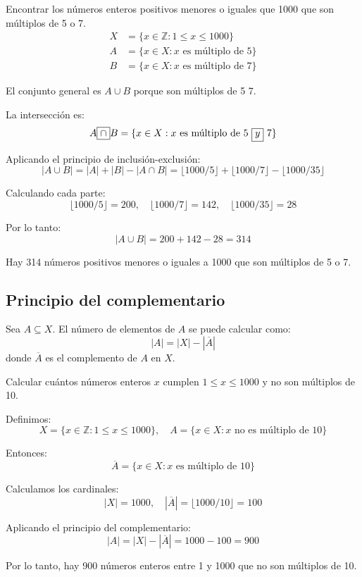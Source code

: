 \documentclass[a4paper,12pt]{article}
\begin{document}
\begin{ejemplo}[title=Ejemplo: Números múltiplos de 5 o 7]
Encontrar los números enteros positivos menores o iguales que 1000 que son múltiplos de 5 o 7.
\begin{align*}
X &= \{ x \in \mathbb{Z} : 1 \le x \le 1000 \} \\
A &= \{ x \in X : x \text{ es múltiplo de 5} \} \\
B &= \{ x \in X : x \text{ es múltiplo de 7} \}
\end{align*}

El conjunto general es $A \boxed{\cup} B$ porque son múltiplos de 5  7.

La intersección es:
\[
A \boxed{\cap} B = \{ x \in X : x \text{ es múltiplo de 5 \boxed{y}
7} \}
\]

Aplicando el principio de inclusión-exclusión:
\[
|A \cup B| = |A| + |B| - |A \cap B| = \lfloor 1000/5 \rfloor + \lfloor 1000/7 \rfloor \boxed{-} \lfloor 1000/35 \rfloor
\]

Calculando cada parte:
\[
\lfloor 1000/5 \rfloor = 200, \quad
\lfloor 1000/7 \rfloor = 142, \quad
\lfloor 1000/35 \rfloor = 28
\]

Por lo tanto:
\[
|A \cup B| = 200 + 142 - 28 = 314
\]

Hay 314 números positivos menores o iguales a 1000 que son múltiplos de 5 o 7.
\end{ejemplo}

\subsection{Principio del complementario}

\begin{procedimiento}[title=Principio del complementario]
Sea $A \subseteq X$. El número de elementos de $A$ se puede calcular como:
\[
|A| = |X| - |\overline{A}|
\]
donde $\overline{A}$ es el complemento de $A$ en $X$.
\end{procedimiento}

\begin{ejemplo}[title=Ejemplo: Números no múltiplos de 10]
Calcular cuántos números enteros $x$ cumplen $1 \le x \le 1000$ y no son múltiplos de 10.

Definimos:
\[
X = \{ x \in \mathbb{Z} : 1 \le x \le 1000 \}, \quad 
A = \{ x \in X : x \text{ no es múltiplo de 10} \}
\]

Entonces:
\[
\overline{A} = \{ x \in X : x \text{ es múltiplo de 10} \}
\]

Calculamos los cardinales:
\[
|X| = 1000, \quad |\overline{A}| = \lfloor 1000/10 \rfloor = 100
\]

Aplicando el principio del complementario:
\[
|A| = |X| - |\overline{A}| = 1000 - 100 = 900
\]

Por lo tanto, hay 900 números enteros entre 1 y 1000 que no son múltiplos de 10.
\end{ejemplo}
\end{document}
